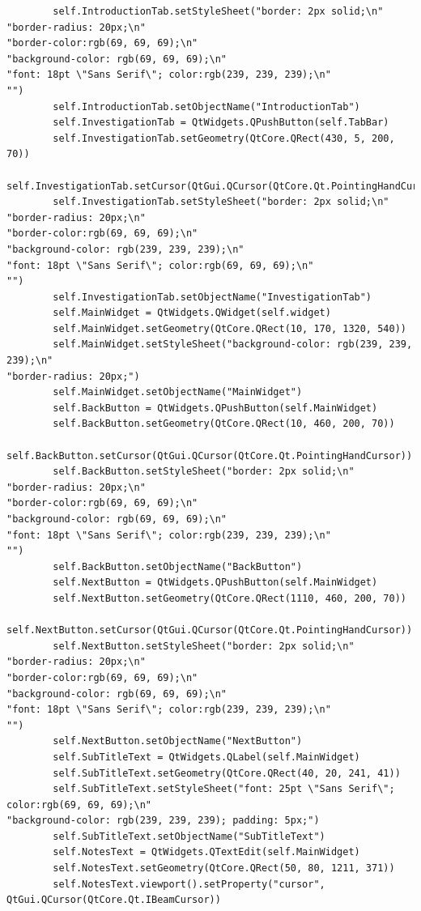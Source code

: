 \documentclass{article}
\begin{document}
\begin{lstlisting}
        self.IntroductionTab.setStyleSheet("border: 2px solid;\n"
"border-radius: 20px;\n"
"border-color:rgb(69, 69, 69);\n"
"background-color: rgb(69, 69, 69);\n"
"font: 18pt \"Sans Serif\"; color:rgb(239, 239, 239);\n"
"")
        self.IntroductionTab.setObjectName("IntroductionTab")
        self.InvestigationTab = QtWidgets.QPushButton(self.TabBar)
        self.InvestigationTab.setGeometry(QtCore.QRect(430, 5, 200, 70))
        self.InvestigationTab.setCursor(QtGui.QCursor(QtCore.Qt.PointingHandCursor))
        self.InvestigationTab.setStyleSheet("border: 2px solid;\n"
"border-radius: 20px;\n"
"border-color:rgb(69, 69, 69);\n"
"background-color: rgb(239, 239, 239);\n"
"font: 18pt \"Sans Serif\"; color:rgb(69, 69, 69);\n"
"")
        self.InvestigationTab.setObjectName("InvestigationTab")
        self.MainWidget = QtWidgets.QWidget(self.widget)
        self.MainWidget.setGeometry(QtCore.QRect(10, 170, 1320, 540))
        self.MainWidget.setStyleSheet("background-color: rgb(239, 239, 239);\n"
"border-radius: 20px;")
        self.MainWidget.setObjectName("MainWidget")
        self.BackButton = QtWidgets.QPushButton(self.MainWidget)
        self.BackButton.setGeometry(QtCore.QRect(10, 460, 200, 70))
        self.BackButton.setCursor(QtGui.QCursor(QtCore.Qt.PointingHandCursor))
        self.BackButton.setStyleSheet("border: 2px solid;\n"
"border-radius: 20px;\n"
"border-color:rgb(69, 69, 69);\n"
"background-color: rgb(69, 69, 69);\n"
"font: 18pt \"Sans Serif\"; color:rgb(239, 239, 239);\n"
"")
        self.BackButton.setObjectName("BackButton")
        self.NextButton = QtWidgets.QPushButton(self.MainWidget)
        self.NextButton.setGeometry(QtCore.QRect(1110, 460, 200, 70))
        self.NextButton.setCursor(QtGui.QCursor(QtCore.Qt.PointingHandCursor))
        self.NextButton.setStyleSheet("border: 2px solid;\n"
"border-radius: 20px;\n"
"border-color:rgb(69, 69, 69);\n"
"background-color: rgb(69, 69, 69);\n"
"font: 18pt \"Sans Serif\"; color:rgb(239, 239, 239);\n"
"")
        self.NextButton.setObjectName("NextButton")
        self.SubTitleText = QtWidgets.QLabel(self.MainWidget)
        self.SubTitleText.setGeometry(QtCore.QRect(40, 20, 241, 41))
        self.SubTitleText.setStyleSheet("font: 25pt \"Sans Serif\"; color:rgb(69, 69, 69);\n"
"background-color: rgb(239, 239, 239); padding: 5px;")
        self.SubTitleText.setObjectName("SubTitleText")
        self.NotesText = QtWidgets.QTextEdit(self.MainWidget)
        self.NotesText.setGeometry(QtCore.QRect(50, 80, 1211, 371))
        self.NotesText.viewport().setProperty("cursor", QtGui.QCursor(QtCore.Qt.IBeamCursor))

\end{lstlisting}
\end{document}
